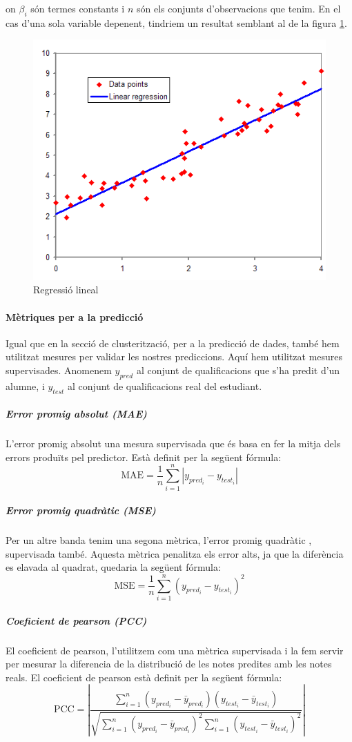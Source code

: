 \documentclass[12pt,a4paper,catalan]{article}
\begin{document}
on $\beta_i$ són termes constants i $n$ són els conjunts d'observacions que tenim. En el cas d'una sola variable depenent, tindriem un resultat semblant al de la figura \ref{fig:linearregressor}.

\begin{figure}[h]
\centering
\includegraphics[width=.5\linewidth]{img/linearregression.png}
\caption{Regressió lineal \cite{imglinearregressor}}
\label{fig:linearregressor}
\end{figure}

\paragraph{Mètriques per a la predicció}
\label{par:metriquespredictors}
Igual que en la secció de clusterització, per a la predicció de dades, també hem utilitzat mesures per validar les nostres prediccions. Aquí hem utilitzat mesures supervisades. Anomenem $y_{pred}$ al conjunt de qualificacions que s'ha predit d'un alumne, i $y_{test}$ al conjunt de qualificacions real del estudiant.

\subparagraph{Error promig absolut (MAE)}
L'error promig absolut \cite{mae} una mesura supervisada que és basa en fer la mitja dels errors produïts pel predictor. Està definit per la següent fórmula:
$$ \mathrm{MAE} = \frac{1}{n}\sum_{i=1}^n \left| y_{pred_i}-y_{test_i}\right| $$

\subparagraph{Error promig quadràtic (MSE)}
Per un altre banda tenim una segona mètrica, l'error promig quadràtic \cite{mse}, supervisada també. Aquesta mètrica penalitza els error alts, ja que la diferència es elavada al quadrat, quedaria la següent fórmula:
$$\mathrm{MSE}=\frac{1}{n}\sum_{i=1}^n(y_{pred_i}-y_{test_i})^2$$

\subparagraph{Coeficient de pearson (PCC)}
El coeficient de pearson, l'utilitzem com una mètrica supervisada i la fem servir per mesurar la diferencia de la distribució de les notes predites amb les notes reals. El coeficient de pearson està definit per la següent fórmula:
$$\mathrm{PCC} =\left| \frac{\sum_{i=1}^n(y_{pred_i} - \bar{y}_{pred_i})(y_{test_i} - \bar{y}_{test_i})}{\sqrt{\sum_{i=1}^n(y_{pred_i} - \bar{y}_{pred_i})^2  \sum_{i=1}^n(y_{test_i} - \bar{y}_{test_i})^2}}\right|$$
\end{document}

